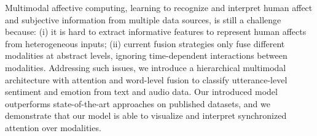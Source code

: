Multimodal affective computing, learning to recognize and interpret human affect and subjective information from multiple data sources, is still a challenge because: (i) it is hard to extract informative features to represent human affects from heterogeneous inputs; (ii) current fusion strategies only fuse different modalities at abstract levels, ignoring time-dependent interactions between modalities. Addressing such issues, we introduce a hierarchical multimodal architecture with attention and word-level fusion to classify utterance-level sentiment and emotion from text and audio data. Our introduced model outperforms state-of-the-art approaches on published datasets, and we demonstrate that our model is able to visualize and interpret synchronized attention over modalities.
